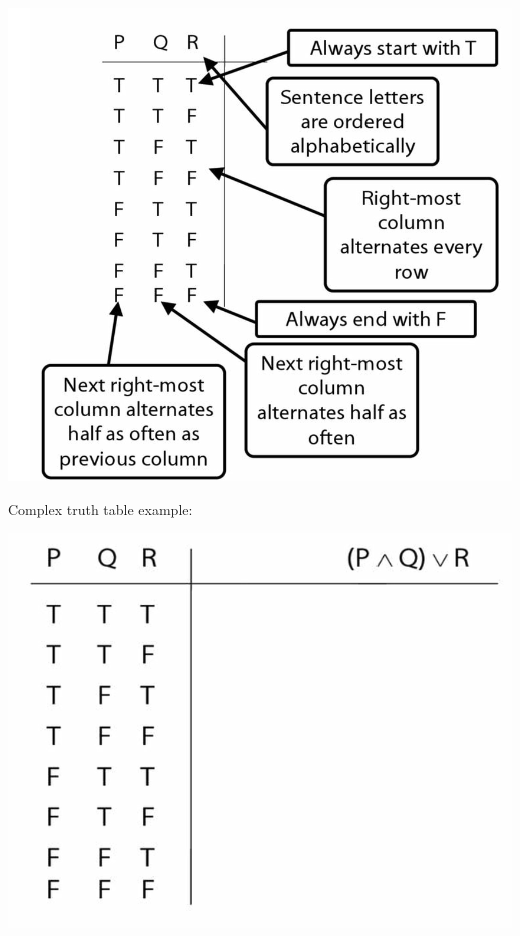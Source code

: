 \documentclass[12pt]{extarticle}
\begin{document}
\begin{multicols*}{3}
\begin{center}
\includegraphics[scale=0.3]{img/how_to_write_truth_tables.png}
\end{center}
\begin{minipage}{\columnwidth}
 
Complex truth table example:
 
\begin{center}
\includegraphics[scale=0.3]{img/tt_p_and_q_or_r.png}
\end{center}
\end{minipage}
 

\end{multicols*}
\end{document}
